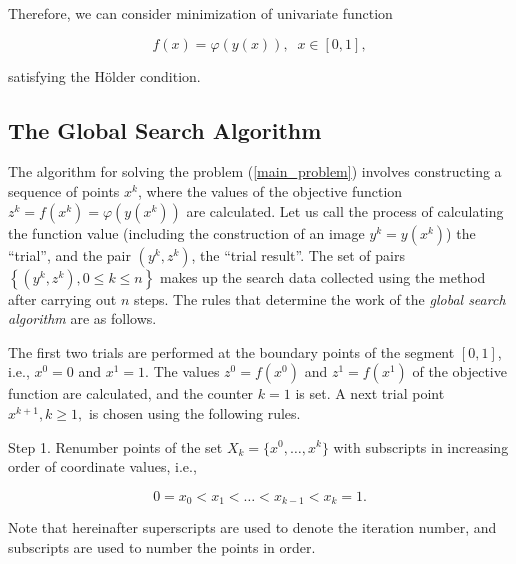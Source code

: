 \documentclass[mathematics,article,accept,pdftex,moreauthors]{Definitions/mdpi}
\begin{document}
Therefore, we can consider minimization of univariate function
\begin{linenomath}
\begin{equation}
f(x)=\varphi(y(x)), \;\; x\in[0,1],
\end{equation}
\end{linenomath}
satisfying the H{\"o}lder condition.


\newpage


\subsection{The Global Search Algorithm}\label{GSA}

The algorithm for solving the problem (\ref{main_problem}) involves constructing a sequence of points $x^k$, where the values of the objective function $z^k = f(x^k)=\varphi(y(x^k))$ are calculated. Let us call the process of calculating the function value (including the construction of an image $y^k=y(x^k)$) the ``trial'', and the pair $(y^k, z^k)$, the ``trial result''. The set of pairs $\left\{(y^k, z^k), 0\leq k\leq n\right\}$ makes up the search data collected using the method after carrying out $n$ steps. The rules that determine the work of the \textit{global search algorithm} are as follows.

The first two trials are performed at the boundary points of the segment $[0,1]$, i.e., $x^0 = 0$ and $x^1 = 1$. The values $z^0 = f(x^0)$ and $z^1 = f(x^1)$ of the objective function are calculated, and the counter $k = 1$ is set. A next trial point $x^{k+1}, k \geq 1,$ is chosen using the following rules.

Step 1. Renumber points of the set $X_k=\{x^0,\dots,x^k\} $ with subscripts in increasing order of coordinate values, i.e.,
\begin{linenomath}
\begin{equation}
0=x_0<x_1<\dots <x_{k-1}<x_{k}=1.
\end{equation}
\end{linenomath}


Note that hereinafter superscripts are used to denote the iteration number, and subscripts are used to number the points in order.
\end{document}
